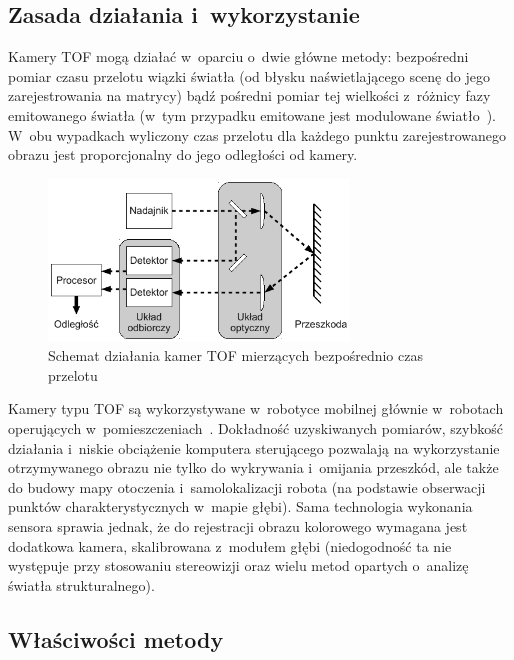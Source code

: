\subsection{Zasada działania i~wykorzystanie}

Kamery TOF mogą działać w~oparciu o~dwie główne metody: bezpośredni pomiar
czasu przelotu wiązki światła (od błysku naświetlającego scenę do jego
zarejestrowania na matrycy) bądź pośredni pomiar tej wielkości z~różnicy fazy
emitowanego światła (w~tym przypadku emitowane jest modulowane
światło~\cite{910448}). W~obu wypadkach wyliczony czas przelotu dla każdego
punktu zarejestrowanego obrazu jest proporcjonalny do jego odległości od kamery.

\begin{figure}[h!]
\centering
\includegraphics[width=8cm]{../../Common/img/tof}
\caption{Schemat działania kamer TOF mierzących bezpośrednio czas przelotu}
\label{fig:tof}
\end{figure}

Kamery typu TOF są wykorzystywane w~robotyce mobilnej głównie w~robotach
operujących w~pomieszczeniach~\cite{Prusak:2008:PEM:1462089.1462102}. Dokładność
uzyskiwanych pomiarów, szybkość działania i~niskie obciążenie komputera
sterującego pozwalają na wykorzystanie otrzymywanego obrazu nie tylko do
wykrywania i~omijania przeszkód, ale także do budowy mapy otoczenia 
i~samolokalizacji robota (na podstawie obserwacji punktów charakterystycznych 
w~mapie głębi). Sama technologia wykonania sensora sprawia jednak, że do
rejestracji obrazu kolorowego wymagana jest dodatkowa kamera, skalibrowana 
z~modułem głębi (niedogodność ta nie występuje przy stosowaniu stereowizji oraz
wielu metod opartych o~analizę światła strukturalnego).

\subsection{Właściwości metody}

